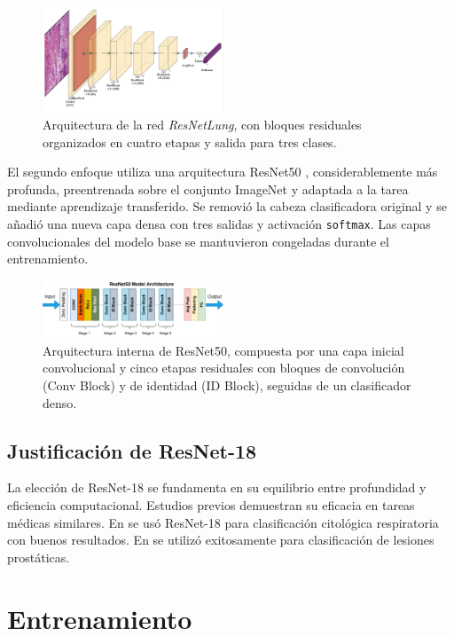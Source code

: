 \documentclass[conference]{IEEEtran}
\begin{document}
\begin{figure}[H]
\centering
\includegraphics[width=0.48\textwidth]{figs/resnetlung_architecture.png}
\caption{Arquitectura de la red \textit{ResNetLung}, con bloques residuales organizados en cuatro etapas y salida para tres clases.}
\label{fig:architecture}
\end{figure}

El segundo enfoque utiliza una arquitectura ResNet50 \cite{he2016resnet}, considerablemente más profunda, preentrenada sobre el conjunto ImageNet y adaptada a la tarea mediante aprendizaje transferido. Se removió la cabeza clasificadora original y se añadió una nueva capa densa con tres salidas y activación \texttt{softmax}. Las capas convolucionales del modelo base se mantuvieron congeladas durante el entrenamiento.

\begin{figure}[H]
\centering
\includegraphics[width=0.48\textwidth]{figs/restnet50.png}
\caption{Arquitectura interna de ResNet50, compuesta por una capa inicial convolucional y cinco etapas residuales con bloques de convolución (Conv Block) y de identidad (ID Block), seguidas de un clasificador denso.}
\label{fig:resnet50}
\end{figure}


\subsection{Justificaci\'on de ResNet-18}
La elecci\'on de ResNet-18 se fundamenta en su equilibrio entre profundidad y eficiencia computacional. Estudios previos demuestran su eficacia en tareas m\'edicas similares. En \cite{xu2024resnet} se us\'o ResNet-18 para clasificaci\'on citol\'ogica respiratoria con buenos resultados. En \cite{wang2024pirads} se utiliz\'o exitosamente para clasificaci\'on de lesiones prost\'aticas.

\section{Entrenamiento}
\end{document}

